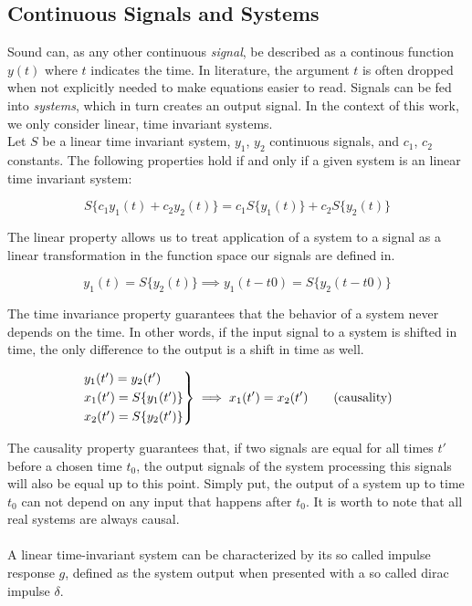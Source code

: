 \subsection{Continuous Signals and Systems}

Sound can, as any other continuous \textit{signal}, be described as a continous function $y(t)$ where $t$ indicates the time. In literature, the argument $t$ is often dropped  when not explicitly needed to make equations easier to read.  
Signals can be fed into \textit{systems}, which in turn creates an output signal. In the context of this work, we only consider linear, time invariant systems. 
\\
Let $S$ be a linear time invariant system, $y_1$, $y_2$ continuous signals, and $c_1$, $c_2$ constants. The following properties hold if and only if a given system is an linear time invariant system: 

\[S\{c_1 y_1(t) + c_2 y_2(t)\} = c_1 S\{y_1(t)\} + c_2 S\{y_2(t)\} \tag{linearity}\]

The linear property allows us to treat application of a system to a signal as a linear transformation in the function space our signals are defined in. 

\[y_1(t) = S\{y_2(t)\} \implies y_1(t - t0) = S\{y_2(t - t0)\} \tag{time invariance}\]

The time invariance property guarantees that the behavior of a system never depends on the time. In other words, if the input signal to a system is shifted in time, the only difference to the output is a shift in time as well.

\[
\begin{rcases*}
y_1(t') = y_2(t') \\
x_1(t') = S\{y_1(t')\} \\ 
x_2(t') = S\{y_2(t')\} \\
\end{rcases*} \implies x_1(t') = x_2(t') \tag{causality}\]

The causality property guarantees that, if two signals are equal for all times $t'$ before a chosen time $t_0$, the output signals of the system processing this signals will also be equal up to this point. Simply put, the output of a system up to time $t_0$ can not depend on any input that happens after $t_0$. It is worth to note that all real systems are always causal. 
\\ \\
A linear time-invariant system can be characterized by its so called impulse response $g$, defined as the system output when presented with a so called dirac impulse $\delta$.

